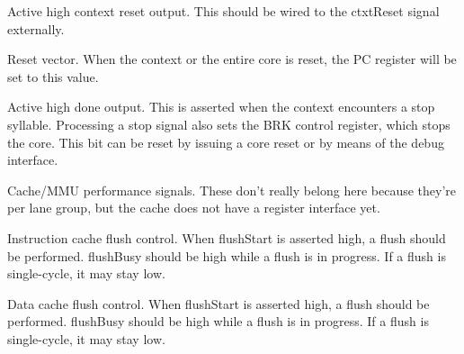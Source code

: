 
\contextInterface{}

\ifaceSubGroup{}
Active high context reset output. This should be wired to the ctxtReset signal
externally.
    
\ifaceSubGroup{}
Reset vector. When the context or the entire core is reset, the PC register will 
be set to this value.
    
\ifaceSubGroup{}
Active high done output. This is asserted when the context encounters a stop 
syllable. Processing a stop signal also sets the BRK control register, which 
stops the core. This bit can be reset by issuing a core reset or by means of the 
debug interface.

\ifaceSubGroup{}
Cache/MMU performance signals. These don't really belong here because they're
per lane group, but the cache does not have a register interface yet.


\ifaceSubGroup{}
Instruction cache flush control. When flushStart is asserted high, a flush
should be performed. flushBusy should be high while a flush is in progress. If
a flush is single-cycle, it may stay low.

\ifaceSubGroup{}
Data cache flush control. When flushStart is asserted high, a flush should be 
performed. flushBusy should be high while a flush is in progress. If a flush is 
single-cycle, it may stay low.

